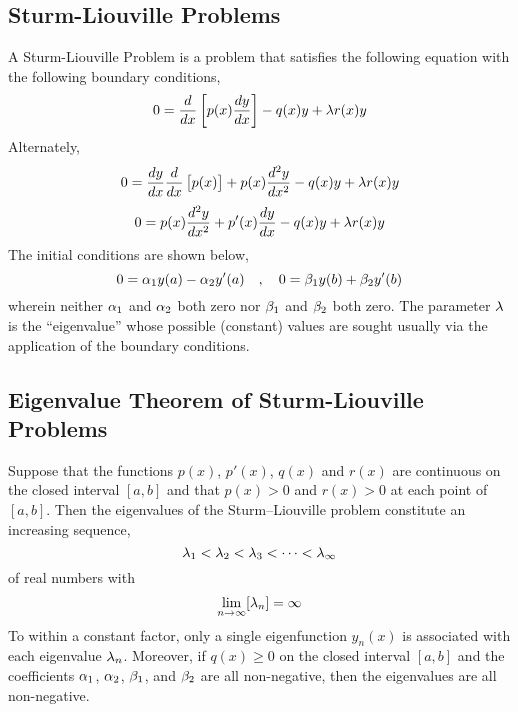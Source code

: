 \documentclass[class=report, 12pt, crop=false]{standalone}
\begin{document}
\begin{center}


\chapter{Sturm-Liouville Problems}
\begin{comment}
\end{comment}
A Sturm-Liouville Problem is a problem that satisfies the following equation with the following boundary conditions,
$$0 = \frac{d}{dx}\left[p(x)\frac{dy}{dx}\right]-q(x)y+\lambda r(x)y$$
Alternately,
$$0 = \frac{dy}{dx}\frac{d}{dx}\left[p(x)\right] + p(x)\frac{d^2y}{dx^2}-q(x)y+\lambda r(x)y$$
$$0 = p(x)\frac{d^2y}{dx^2} + p'(x)\frac{dy}{dx}-q(x)y+\lambda r(x)y$$
The initial conditions are shown below,
$$0 = \alpha_1y(a) - \alpha_2y'(a)\quad,\quad 0 = \beta_1y(b) + \beta_2y'(b)$$                                        wherein neither $\alpha_1$ and $\alpha_2$ both zero nor $\beta_1$ and $\beta_2$ both zero. The parameter $\lambda$ is the “eigenvalue” whose possible (constant) values are sought usually via the application of the boundary conditions.    
\section{Eigenvalue Theorem of Sturm-Liouville Problems}
\begin{comment}
\end{comment}
Suppose that the functions $p(x)$, $p'(x)$, $q(x)$ and $r(x)$ are continuous on the closed interval $[a,b]$ and that $p(x)>0$ and $r(x)>0$ at each point of $[a,b]$. Then the eigenvalues of the Sturm–Liouville problem constitute an increasing sequence,
$$\lambda_1 < \lambda_2 < \lambda_3 < \dots <\lambda_\infty$$
of real numbers with
$$\lim_{n\to\infty}[\lambda_n] = \infty$$To within a constant factor, only a single eigenfunction $y_n(x)$ is associated with each eigenvalue $\lambda_n$. Moreover, if $q(x)\geq0$ on the closed interval $[a,b]$ and the coefficients $\alpha_1$, $\alpha_2$, $\beta_1$, and $\beta_2$ are all non-negative, then the eigenvalues are all non-negative.

\end{center}
\end{document}
